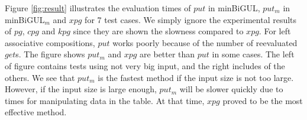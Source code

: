 Figure \ref{fig:result} illustrates the evaluation times of $put$ in minBiGUL, $put_m$ in minBiGUL$_m$ and $xpg$ for 7 test cases. We simply ignore the experimental results of $pg$, $cpg$ and $kpg$ since they are shown the slowness compared to $xpg$. For left associative compositions, $put$ works poorly because of the number of reevaluated $get$s. The figure shows $put_m$ and $xpg$ are better than $put$ in some cases. The left of figure contains tests using not very big input, and the right includes of the others. We see that $put_m$ is the fastest method if the input size is not too large. However, if the input size is large enough, $put_m$ will be slower quickly due to times for manipulating data in the table. At that time, $xpg$ proved to be the most effective method.
